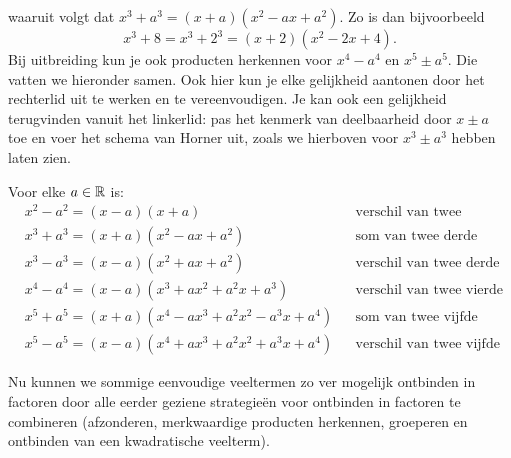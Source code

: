 \documentclass{ximera}
\begin{document}

waaruit volgt dat  \(x^3 + a^3 = (x+a)(x^2-ax+a^2)\). Zo is dan bijvoorbeeld
\[
x^3+8 = x^3 + 2^3 = (x+2)(x^2-2x+4).
\]
Bij uitbreiding kun je ook producten herkennen voor \(x^4-a^4\) en \(x^5 \pm a^5\). Die vatten we hieronder samen. Ook hier kun je elke gelijkheid aantonen door het rechterlid uit te werken en te vereenvoudigen. Je kan ook een gelijkheid terugvinden vanuit het linkerlid: pas het kenmerk van deelbaarheid door \(x \pm a\) toe en voer het schema van Horner uit, zoals we hierboven voor \(x^3 \pm a^3\) hebben laten zien.
	
\begin{proposition} 
Voor elke \(a \in \mathbb{R}\) is:
\begin{align*}
& x^2 - a^2 = (x-a)(x+a) && \text{verschil van twee kwadraten} \\
& x^3 + a^3 = (x+a)(x^2 - ax + a^2) && \text{som van twee derde machten} \\
& x^3 - a^3 = (x-a)(x^2 + ax + a^2) && \text{verschil van twee derde machten} \\
& x^4 - a^4 = (x-a)(x^3 + ax^2 + a^2x + a^3) && \text{verschil van twee vierde machten} \\
& x^5 + a^5 = (x+a)(x^4 - ax^3 + a^2x^2 - a^3x + a^4) && \text{som van twee vijfde machten} \\
& x^5 - a^5 = (x-a)(x^4 + ax^3 + a^2x^2 + a^3x + a^4) && \text{verschil van twee vijfde machten.}
\end{align*}
\end{proposition} 



Nu kunnen we sommige eenvoudige veeltermen zo ver mogelijk ontbinden in factoren door alle eerder geziene strategieën voor ontbinden in factoren te combineren (afzonderen, merkwaardige producten herkennen, groeperen en ontbinden van een kwadratische veelterm).
\end{document}
